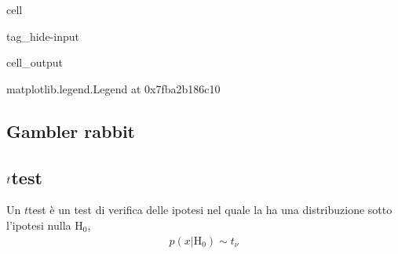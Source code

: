 \documentclass[letterpaper,10pt,italian]{jupyterBook}
\begin{document}
\begin{sphinxuseclass}{cell}
\begin{sphinxuseclass}{tag_hide-input}\begin{sphinxVerbatimOutput}

\begin{sphinxuseclass}{cell_output}
\begin{sphinxVerbatim}[commandchars=\\\{\}]
\PYGZlt{}matplotlib.legend.Legend at 0x7fba2b186c10\PYGZgt{}
\end{sphinxVerbatim}

\noindent{}

\end{sphinxuseclass}\end{sphinxVerbatimOutput}

\end{sphinxuseclass}
\end{sphinxuseclass}
\sphinxstepscope


\subsection{Gambler rabbit}
\label{\detokenize{ch/statistics/test-fisher-rabbit:gambler-rabbit}}\label{\detokenize{ch/statistics/test-fisher-rabbit::doc}}
\sphinxstepscope


\subsection{\protect\(t\protect\)\sphinxhyphen{}test}
\label{\detokenize{ch/statistics/t-test:t-test}}\label{\detokenize{ch/statistics/t-test::doc}}


\sphinxAtStartPar
Un \(t\)\sphinxhyphen{}test è un test di verifica delle ipotesi nel quale la  ha una distribuzione  sotto l’ipotesi nulla \(\text{H}_0\),
\begin{equation*}
\begin{split}p(x|\text{H}_0) \sim t_{\nu}\end{split}
\end{equation*}
\end{document}
